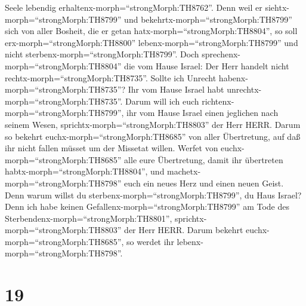 Seele lebendig erhaltenx-morph=``strongMorph:TH8762''. 
Denn weil er siehtx-morph=``strongMorph:TH8799'' und
bekehrtx-morph=``strongMorph:TH8799'' sich von aller Bosheit, die er
getan hatx-morph=``strongMorph:TH8804'', so soll
erx-morph=``strongMorph:TH8800'' lebenx-morph=``strongMorph:TH8799'' und
nicht sterbenx-morph=``strongMorph:TH8799''.  Doch
sprechenx-morph=``strongMorph:TH8804'' die vom Hause Israel: Der Herr
handelt nicht rechtx-morph=``strongMorph:TH8735''. Sollte ich Unrecht
habenx-morph=``strongMorph:TH8735''? Ihr vom Hause Israel habt
unrechtx-morph=``strongMorph:TH8735''.  Darum will ich euch
richtenx-morph=``strongMorph:TH8799'', ihr vom Hause Israel einen
jeglichen nach seinem Wesen, sprichtx-morph=``strongMorph:TH8803'' der
Herr HERR. Darum so bekehrt euchx-morph=``strongMorph:TH8685'' von aller
Übertretung, auf daß ihr nicht fallen müsset um der Missetat willen.
 Werfet von euchx-morph=``strongMorph:TH8685'' alle eure
Übertretung, damit ihr übertreten habtx-morph=``strongMorph:TH8804'',
und machetx-morph=``strongMorph:TH8798'' euch ein neues Herz und einen
neuen Geist. Denn warum willst du sterbenx-morph=``strongMorph:TH8799'',
du Haus Israel?  Denn ich habe keinen
Gefallenx-morph=``strongMorph:TH8799'' am Tode des
Sterbendenx-morph=``strongMorph:TH8801'',
sprichtx-morph=``strongMorph:TH8803'' der Herr HERR. Darum bekehrt
euchx-morph=``strongMorph:TH8685'', so werdet ihr
lebenx-morph=``strongMorph:TH8798''.

\hypertarget{section-18}{%
\section{19}\label{section-18}}

